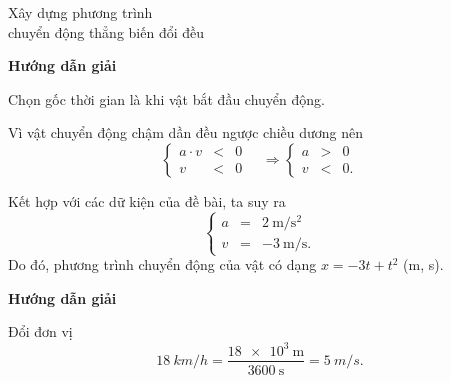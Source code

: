 \begin{dang}{Xây dựng phương trình\\ chuyển động thẳng biến đổi đều}
	{	\begin{center}
			\textbf{Hướng dẫn giải}
		\end{center}
		
		Chọn gốc thời gian là khi vật bắt đầu chuyển động.
		
		Vì vật chuyển động chậm dần đều ngược chiều dương nên
		\begin{equation*}
			\left\{
			\begin{array}{rcl}
				a\cdot v &<&0\\
				v &<& 0
			\end{array}
			\right.
			\quad
			\Rightarrow 
			\left\{
			\begin{array}{rcl}
				a &>& 0\\
				v &<& 0.
			\end{array}
			\right.
		\end{equation*}
		
		Kết hợp với các dữ kiện của đề bài, ta suy ra
		\begin{equation*}
			\left\{
			\begin{array}{rcr}
				a&=&\SI{2}{\meter/\second^2}\\
				v&=&\SI{-3}{\meter/\second} .
			\end{array}
			\right.
		\end{equation*}
		Do đó, phương trình chuyển động của vật có dạng
		$x=-3t+t^2$ (m, s).
	}
	{	\begin{center}
			\textbf{Hướng dẫn giải}
		\end{center}
		
		Đổi đơn vị $$\SI{18}{km/h} = \dfrac{\SI{18e3}{\meter}}{\SI{3600}{\second}}=\SI{5}{m/s}.$$
		
}
\end{dang}
